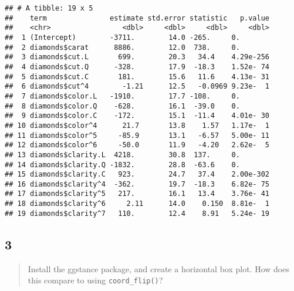 \documentclass[]{article}
\newenvironment{Shaded}{\begin{snugshade}}{\end{snugshade}}
\newcommand{\DataTypeTok}[1]{\textcolor[rgb]{0.13,0.29,0.53}{#1}}
\newcommand{\KeywordTok}[1]{\textcolor[rgb]{0.13,0.29,0.53}{\textbf{#1}}}
\newcommand{\NormalTok}[1]{#1}
\newcommand{\OperatorTok}[1]{\textcolor[rgb]{0.81,0.36,0.00}{\textbf{#1}}}
\newcommand{\StringTok}[1]{\textcolor[rgb]{0.31,0.60,0.02}{#1}}
\begin{document}
\begin{verbatim}
## # A tibble: 19 x 5
##    term               estimate std.error statistic   p.value
##    <chr>                 <dbl>     <dbl>     <dbl>     <dbl>
##  1 (Intercept)        -3711.        14.0 -265.     0.       
##  2 diamonds$carat      8886.        12.0  738.     0.       
##  3 diamonds$cut.L       699.        20.3   34.4    4.29e-256
##  4 diamonds$cut.Q      -328.        17.9  -18.3    1.52e- 74
##  5 diamonds$cut.C       181.        15.6   11.6    4.13e- 31
##  6 diamonds$cut^4        -1.21      12.5   -0.0969 9.23e-  1
##  7 diamonds$color.L   -1910.        17.7 -108.     0.       
##  8 diamonds$color.Q    -628.        16.1  -39.0    0.       
##  9 diamonds$color.C    -172.        15.1  -11.4    4.01e- 30
## 10 diamonds$color^4      21.7       13.8    1.57   1.17e-  1
## 11 diamonds$color^5     -85.9       13.1   -6.57   5.00e- 11
## 12 diamonds$color^6     -50.0       11.9   -4.20   2.62e-  5
## 13 diamonds$clarity.L  4218.        30.8  137.     0.       
## 14 diamonds$clarity.Q -1832.        28.8  -63.6    0.       
## 15 diamonds$clarity.C   923.        24.7   37.4    2.00e-302
## 16 diamonds$clarity^4  -362.        19.7  -18.3    6.82e- 75
## 17 diamonds$clarity^5   217.        16.1   13.4    3.76e- 41
## 18 diamonds$clarity^6     2.11      14.0    0.150  8.81e-  1
## 19 diamonds$clarity^7   110.        12.4    8.91   5.24e- 19
\end{verbatim}

\hypertarget{section-11}{%
\subsection{3}\label{section-11}}

\begin{quote}
Install the ggstance package, and create a horizontal box plot. How does
this compare to using \texttt{coord\_flip()}?
\end{quote}

\begin{Shaded}
\end{Shaded}
\end{document}
